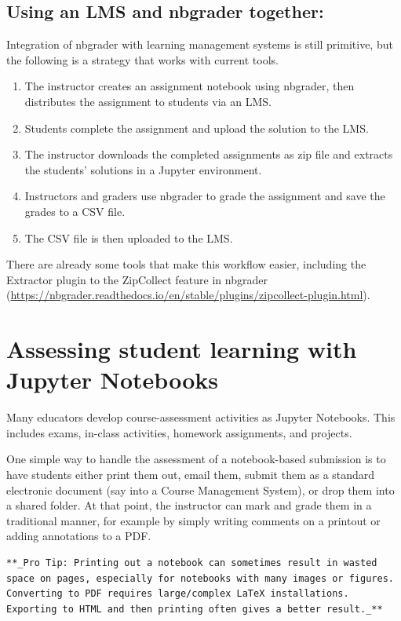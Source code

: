 \documentclass[]{book}
\providecommand{\tightlist}{%
  \setlength{\itemsep}{0pt}\setlength{\parskip}{0pt}}
\begin{document}
\subsection{Using an LMS and nbgrader
together:}\label{using-an-lms-and-nbgrader-together}

Integration of nbgrader with learning management systems is still
primitive, but the following is a strategy that works with current
tools.

\begin{enumerate}
\def\labelenumi{\arabic{enumi}.}
\tightlist
\item
  The instructor creates an assignment notebook using nbgrader, then
  distributes the assignment to students via an LMS.
\item
  Students complete the assignment and upload the solution to the LMS.
\item
  The instructor downloads the completed assignments as zip file and
  extracts the students' solutions in a Jupyter environment.
\item
  Instructors and graders use nbgrader to grade the assignment and save
  the grades to a CSV file.
\item
  The CSV file is then uploaded to the LMS.
\end{enumerate}

There are already some tools that make this workflow easier, including
the Extractor plugin to the ZipCollect feature in nbgrader
(\url{https://nbgrader.readthedocs.io/en/stable/plugins/zipcollect-plugin.html}).

\section{Assessing student learning with Jupyter
Notebooks}\label{assessing-student-learning-with-jupyter-notebooks}

Many educators develop course-assessment activities as Jupyter
Notebooks. This includes exams, in-class activities, homework
assignments, and projects.

One simple way to handle the assessment of a notebook-based submission
is to have students either print them out, email them, submit them as a
standard electronic document (say into a Course Management System), or
drop them into a shared folder. At that point, the instructor can mark
and grade them in a traditional manner, for example by simply writing
comments on a printout or adding annotations to a PDF.

\begin{verbatim}
**_Pro Tip: Printing out a notebook can sometimes result in wasted space on pages, especially for notebooks with many images or figures. Converting to PDF requires large/complex LaTeX installations. Exporting to HTML and then printing often gives a better result._**
\end{verbatim}
\end{document}
